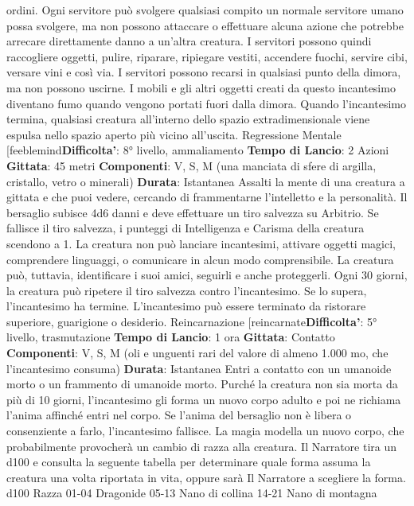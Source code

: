 \begin{multicols}{2}
ordini. Ogni servitore può svolgere qualsiasi compito un
normale servitore umano possa svolgere, ma non
possono attaccare o effettuare alcuna azione che
potrebbe arrecare direttamente danno a un’altra
creatura. I servitori possono quindi raccogliere oggetti,
pulire, riparare, ripiegare vestiti, accendere fuochi,
servire cibi, versare vini e così via. I servitori possono
recarsi in qualsiasi punto della dimora, ma non possono
uscirne. I mobili e gli altri oggetti creati da questo
incantesimo diventano fumo quando vengono portati
fuori dalla dimora. Quando l’incantesimo termina,
qualsiasi creatura all’interno dello spazio
extradimensionale viene espulsa nello spazio aperto più
vicino all’uscita.
Regressione Mentale
[feeblemind\textbf{Difficolta'}:
8° livello, ammaliamento
\textbf{Tempo di Lancio}: 2 Azioni
\textbf{Gittata}: 45 metri
\textbf{Componenti}: V, S, M (una manciata di sfere di argilla,
cristallo, vetro o minerali)
\textbf{Durata}: Istantanea
Assalti la mente di una creatura a gittata e che puoi
vedere, cercando di frammentarne l’intelletto e la
personalità. Il bersaglio subisce 4d6 danni e
deve effettuare un tiro salvezza su Arbitrio.
Se fallisce il tiro salvezza, i punteggi di Intelligenza e
Carisma della creatura scendono a 1. La creatura non
può lanciare incantesimi, attivare oggetti magici,
comprendere linguaggi, o comunicare in alcun modo
comprensibile. La creatura può, tuttavia, identificare i
suoi amici, seguirli e anche proteggerli.
Ogni 30 giorni, la creatura può ripetere il tiro salvezza
contro l’incantesimo. Se lo supera, l’incantesimo ha
termine.
L’incantesimo può essere terminato da ristorare
superiore, guarigione o desiderio.
Reincarnazione
[reincarnate\textbf{Difficolta'}:
5° livello, trasmutazione
\textbf{Tempo di Lancio}: 1 ora
\textbf{Gittata}: Contatto
\textbf{Componenti}: V, S, M (oli e unguenti rari del valore di
almeno 1.000 mo, che l’incantesimo consuma)
\textbf{Durata}: Istantanea
Entri a contatto con un umanoide morto o un frammento
di umanoide morto. Purché la creatura non sia morta da
più di 10 giorni, l’incantesimo gli forma un nuovo corpo
adulto e poi ne richiama l’anima affinché entri nel corpo.
Se l’anima del bersaglio non è libera o consenziente a
farlo, l’incantesimo fallisce.
La magia modella un nuovo corpo, che probabilmente
provocherà un cambio di razza alla creatura. Il Narratore tira
un d100 e consulta la seguente tabella per determinare
quale forma assuma la creatura una volta riportata in
vita, oppure sarà Il Narratore a scegliere la forma.
d100 Razza
01-04 Dragonide
05-13 Nano di collina
14-21 Nano di montagna

\end{multicols}
